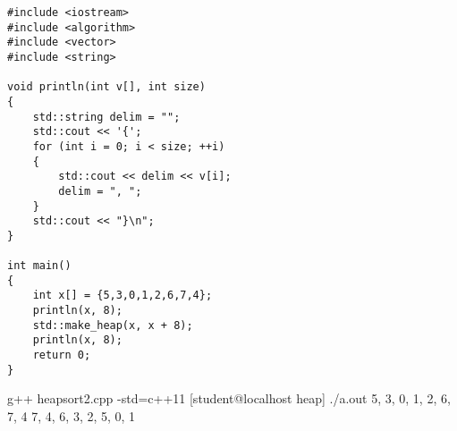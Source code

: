 
\begin{Verbatim}[frame=single, fontsize=\small]
#include <iostream>
#include <algorithm>
#include <vector>
#include <string>

void println(int v[], int size)
{
    std::string delim = "";
    std::cout << '{';
    for (int i = 0; i < size; ++i)
    {
        std::cout << delim << v[i];
        delim = ", ";
    }
    std::cout << "}\n";
}

int main()
{
    int x[] = {5,3,0,1,2,6,7,4};
    println(x, 8);
    std::make_heap(x, x + 8);
    println(x, 8);
    return 0;
}
\end{Verbatim}

\begin{console} g++ heapsort2.cpp -std=c++11
[student@localhost heap] ./a.out
{5, 3, 0, 1, 2, 6, 7, 4}
{7, 4, 6, 3, 2, 5, 0, 1}
\end{console}

